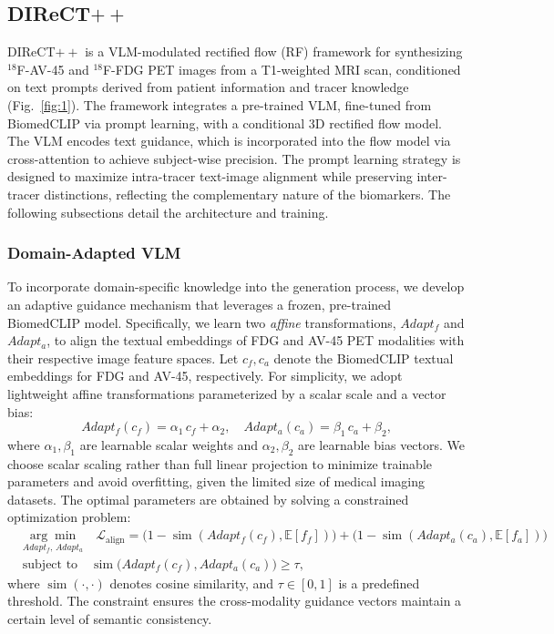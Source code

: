 \documentclass[a4paper]{cas-sc}
\begin{document}
\subsection{DIReCT$++$}
DIReCT$++$ is a VLM-modulated rectified flow (RF) framework for synthesizing $^{18}$F-AV-45 and $^{18}$F-FDG PET images from a T1-weighted MRI scan, conditioned on text prompts derived from patient information and tracer knowledge (Fig.~\ref{fig:1}). The framework integrates a pre-trained VLM, fine-tuned from BiomedCLIP via prompt learning, with a conditional 3D rectified flow model. The VLM encodes text guidance, which is incorporated into the flow model via cross-attention to achieve subject-wise precision. The prompt learning strategy is designed to maximize intra-tracer text-image alignment while preserving inter-tracer distinctions, reflecting the complementary nature of the biomarkers. The following subsections detail the architecture and training.

\subsubsection{Domain-Adapted VLM}
To incorporate domain-specific knowledge into the generation process, we develop an adaptive guidance mechanism that leverages a frozen, pre-trained BiomedCLIP model. Specifically, we learn two \textit{affine} transformations, $Adapt_f$ and $Adapt_a$, to align the textual embeddings of FDG and AV-45 PET modalities with their respective image feature spaces. Let $c_f, c_a$ denote the BiomedCLIP textual embeddings for FDG and AV-45, respectively. 
For simplicity, we adopt lightweight affine transformations parameterized by a scalar scale and a vector bias:
\[
Adapt_f(c_f) = \alpha_1 \, c_f + \alpha_2, \quad
Adapt_a(c_a) = \beta_1 \, c_a + \beta_2,
\]
where $\alpha_1, \beta_1 $ are learnable scalar weights and $\alpha_2, \beta_2 $ are learnable bias vectors. We choose scalar scaling rather than full linear projection to minimize trainable parameters and avoid overfitting, given the limited size of medical imaging datasets. The optimal parameters are obtained by solving a constrained optimization problem:
\begin{equation}
\begin{aligned}
& \underset{Adapt_f,\, Adapt_a}{\arg \min} \quad 
   \mathcal{L}_{\text{align}} = \big(1 - \operatorname{sim}(Adapt_f(c_f), \mathbb{E}[f_f])\big) + \big(1 - \operatorname{sim}(Adapt_a(c_a), \mathbb{E}[f_a])\big) \\
& \text{subject to} \quad 
   \operatorname{sim}\big(Adapt_f(c_f), Adapt_a(c_a)\big) \geq \tau,
\end{aligned}
\label{eq:align_opt}
\end{equation}
where $\operatorname{sim}(\cdot, \cdot)$ denotes cosine similarity, and $\tau \in [0,1]$ is a predefined threshold. The constraint ensures the cross-modality guidance vectors maintain a certain level of semantic consistency.
\end{document}
